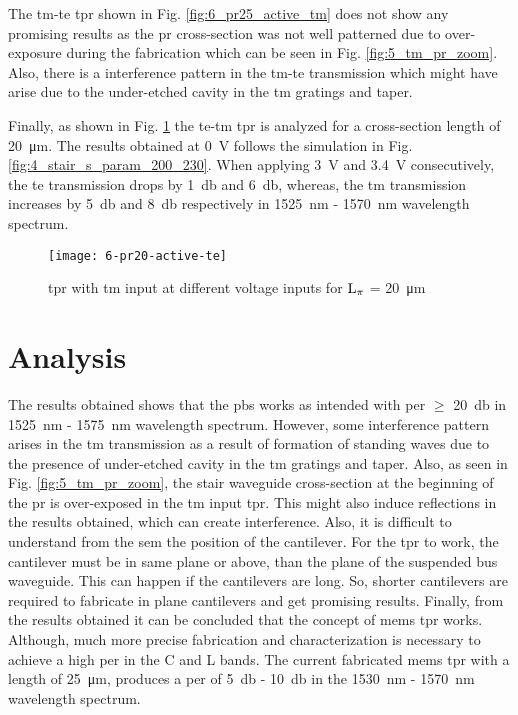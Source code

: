 \documentclass[../report.tex]{subfiles}
\begin{document}
	The \gls{tm}-\gls{te} \gls{tpr} shown in Fig. \ref{fig:6_pr25_active_tm} does not show any promising results as the \gls{pr} cross-section was not well patterned due to over-exposure during the fabrication which can be seen in Fig. \ref{fig:5_tm_pr_zoom}. Also, there is a interference pattern in the \gls{tm}-\gls{te} transmission which might have arise due to the under-etched cavity in the \gls{tm} gratings and taper. \par
	
	Finally, as shown in Fig. \ref{fig:6_pr20_active_te} the \gls{te}-\gls{tm} \gls{tpr} is analyzed for a cross-section length of \SI{20}{\micro \meter}.
	The results obtained at \SI{0}{\volt} follows the simulation in Fig. \ref{fig:4_stair_s_param_200_230}. When applying \SI{3}{\volt} and \SI{3.4}{\volt} consecutively, the \gls{te} transmission drops by \SI{1}{\decibel} and \SI{6}{\decibel}, whereas, the \gls{tm} transmission increases by \SI{5}{\decibel} and \SI{8}{\decibel} respectively in \SI{1525}{\nano \meter} - \SI{1570}{\nano \meter} wavelength spectrum.
	
	\begin{figure}[H] %
		\centering
		\texttt{[image: 6-pr20-active-te]}
		\caption{\gls{tpr} with \gls{tm} input at different voltage inputs for $\mathrm{L_\pi}$ = \SI{20}{\micro \meter}}
		\label{fig:6_pr20_active_te}
	\end{figure}
	
	\section{Analysis}
	The results obtained shows that the \gls{pbs} works as intended with \gls{per} $\geq$ \SI{20}{\decibel} in \SI{1525}{\nano \meter} - \SI{1575}{\nano \meter} wavelength spectrum. However, some interference pattern arises in the \gls{tm} transmission as a result of formation of standing waves due to the presence of under-etched cavity in the \gls{tm} gratings and taper. Also, as seen in Fig. \ref{fig:5_tm_pr_zoom}, the stair waveguide cross-section at the beginning of the \gls{pr} is over-exposed in the \gls{tm} input \gls{tpr}. This might also induce reflections in the results obtained, which can create interference. Also, it is difficult to understand from the \gls{sem} the position of the cantilever. For the \gls{tpr} to work, the cantilever must be in same plane or above, than the plane of the suspended bus waveguide. This can happen if the cantilevers are long. So, shorter cantilevers are required to fabricate in plane cantilevers and get promising results. Finally, from the results obtained it can be concluded that the concept of \gls{mems} \gls{tpr} works. Although, much more precise fabrication and characterization is necessary to achieve a high \gls{per} in the C and L bands. The current fabricated \gls{mems} \gls{tpr} with a length of \SI{25}{\micro \meter}, produces a \gls{per} of \SI{5}{\decibel} - \SI{10}{\decibel} in the \SI{1530}{\nano \meter} - \SI{1570}{\nano \meter} wavelength spectrum.
 
\end{document}

